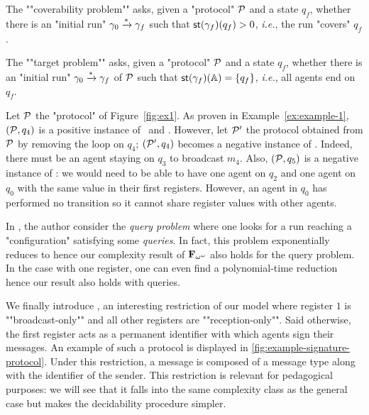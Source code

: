 	
\begin{definition}

	\AP The ""coverability problem"" \COVER asks, given a "protocol" $\mathcal{P}$ and a state $q_f$, whether there is an "initial run" $\gamma_0 \xrightarrow{*} \gamma_f$ such that $\mathsf{st}(\gamma_f)(q_f) > 0$, \emph{i.e.}, the run "covers" $q_f$.
	
	\AP The ""target problem"" \TARGET asks, given a "protocol" $\mathcal{P}$ and a state $q_f$, whether there is an "initial run" $\gamma_0 \xrightarrow{*} \gamma_f$ of $\mathcal{P}$ such that $\mathsf{st}(\gamma_f)(\mathbb{A}) = \{q_f\}$, \emph{i.e.}, all agents end on $q_f$.
\end{definition}

\begin{example}\label{example-2}
	Let $\mathcal{P}$ the "protocol" of Figure~\ref{fig:ex1}. As proven in Example~\ref{ex:example-1}, $(\mathcal{P},q_4)$ is a positive instance of \COVER~and \TARGET. However, let $\mathcal{P}'$ the protocol obtained from $\mathcal{P}$ by removing the loop on $q_4$; $(\mathcal{P}',q_4)$ becomes a negative instance of \TARGET. Indeed, there must be an agent staying on $q_3$ to broadcast $m_4$. Also, $(\mathcal{P}, q_5)$ is a negative instance of \COVER: we would need to be able to have one agent on $q_2$ and one agent on $q_0$ with the same value in their first registers. However, an agent in $q_0$ has performed no transition so it cannot share register values with other agents.
\end{example}

\begin{remark}
	In \cite{DelzannoST13}, the author consider the \AP \emph{query problem} where one looks for a run reaching a "configuration" satisfying some \emph{queries}.	
	In fact, this problem exponentially reduces to \COVER hence our complexity result of $\mathbf{F}_{\omega^\omega}$ also holds for the query problem. In the case with one register, one can even find a polynomial-time reduction hence our \NP result also holds with queries. 
\end{remark}

\AP We finally introduce , an interesting restriction of our model where register $1$ is ""broadcast-only"" and all other registers are ""reception-only"". Said otherwise, the first register acts as a permanent identifier with which agents sign their messages. An example of such a protocol is displayed in \cref{fig:example-signature-protocol}.  Under this restriction, a message is composed of a message type along with the identifier of the sender. This restriction is relevant for pedagogical purposes: we will see that it falls into the same complexity class as the general case but makes the decidability procedure simpler. 

